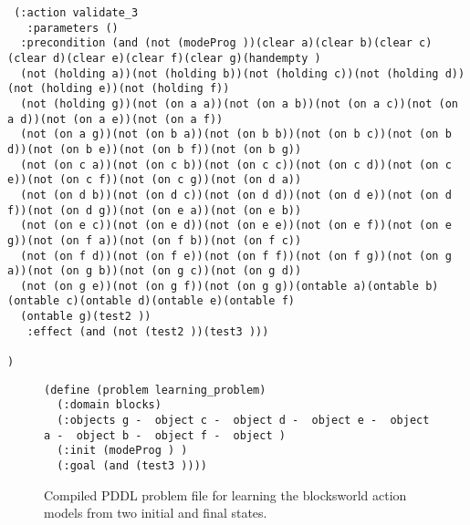 \begin{scriptsize}
\begin{verbatim}
 (:action validate_3
   :parameters ()
  :precondition (and (not (modeProg ))(clear a)(clear b)(clear c)(clear d)(clear e)(clear f)(clear g)(handempty )
  (not (holding a))(not (holding b))(not (holding c))(not (holding d))(not (holding e))(not (holding f))
  (not (holding g))(not (on a a))(not (on a b))(not (on a c))(not (on a d))(not (on a e))(not (on a f))
  (not (on a g))(not (on b a))(not (on b b))(not (on b c))(not (on b d))(not (on b e))(not (on b f))(not (on b g))
  (not (on c a))(not (on c b))(not (on c c))(not (on c d))(not (on c e))(not (on c f))(not (on c g))(not (on d a))
  (not (on d b))(not (on d c))(not (on d d))(not (on d e))(not (on d f))(not (on d g))(not (on e a))(not (on e b))
  (not (on e c))(not (on e d))(not (on e e))(not (on e f))(not (on e g))(not (on f a))(not (on f b))(not (on f c))
  (not (on f d))(not (on f e))(not (on f f))(not (on f g))(not (on g a))(not (on g b))(not (on g c))(not (on g d))
  (not (on g e))(not (on g f))(not (on g g))(ontable a)(ontable b)(ontable c)(ontable d)(ontable e)(ontable f)
  (ontable g)(test2 ))
   :effect (and (not (test2 ))(test3 )))

)

  \end{verbatim}
\end{scriptsize}  



\begin{figure}[hbtp!]
\begin{scriptsize}  
  \begin{verbatim}
(define (problem learning_problem)
  (:domain blocks)
  (:objects g -  object c -  object d -  object e -  object a -  object b -  object f -  object )
  (:init (modeProg ) )
  (:goal (and (test3 ))))
  \end{verbatim}
\end{scriptsize}  
\caption{\small Compiled PDDL problem file for learning the blocksworld action models from two initial and final states.}
\label{fig:compiled-problem}
\end{figure}
